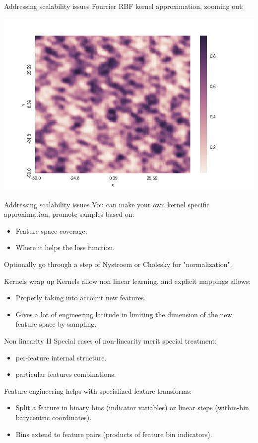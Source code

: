 \documentclass[11pt]{beamer}
\begin{document}
\begin{frame}{Addressing scalability issues}
Fourrier RBF kernel approximation, zooming out:
\begin{center}
\includegraphics[scale=0.3]{arcs_rbfsampler_above.png} 
\end{center}
\end{frame}

\begin{frame}{Addressing scalability issues}
You can make your own kernel specific approximation, promote samples based on:
\begin{itemize}
\item Feature space coverage.
\item Where it helps the loss function.
\end{itemize}
Optionally go through a step of Nystroem or Cholesky for "normalization".

\end{frame}

\begin{frame}{Kernels wrap up}
Kernels allow non linear learning, and explicit mappings allows:
\begin{itemize}
\item Properly taking into account new features.
\item Gives a lot of engineering latitude in limiting the dimension of the new feature space by sampling.
\end{itemize}
\end{frame}

\begin{frame}{Non linearity II}
Special cases of non-linearity merit special treatment:
\begin{itemize}
\item per-feature internal structure.
\item particular features combinations.
\end{itemize}
\pause
Feature engineering helps with specialized feature transforms:
\begin{itemize}
\item Split a feature in binary bins (indicator variables) or linear steps (within-bin barycentric coordinates).
\item Bins extend to feature pairs (products of feature bin indicators).
\end{itemize}
\end{frame}
\end{document}
